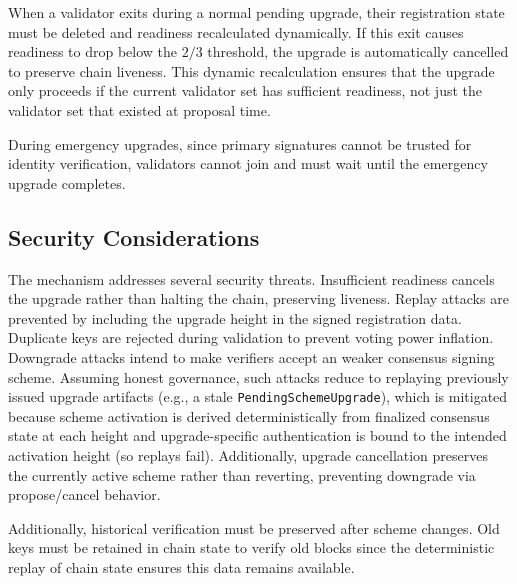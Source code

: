 When a validator exits during a normal pending upgrade, their registration state must be deleted and readiness recalculated dynamically.
If this exit causes readiness to drop below the $2/3$ threshold, the upgrade is automatically cancelled to preserve chain liveness.
This dynamic recalculation ensures that the upgrade only proceeds if the current validator set has sufficient readiness, not just the validator set that existed at proposal time.

During emergency upgrades, since primary signatures cannot be trusted for identity verification, validators cannot join and must wait until the emergency upgrade completes.

\subsection{Security Considerations}\label{subsec:consensus-security}

The mechanism addresses several security threats.
Insufficient readiness cancels the upgrade rather than halting the chain, preserving liveness.
Replay attacks are prevented by including the upgrade height in the signed registration data.
Duplicate keys are rejected during validation to prevent voting power inflation.
Downgrade attacks intend to make verifiers accept an weaker consensus signing scheme.
Assuming honest governance, such attacks reduce to replaying previously issued upgrade artifacts (e.g., a stale \texttt{PendingSchemeUpgrade}), which is mitigated because scheme activation is derived deterministically from finalized consensus state at each height and upgrade-specific authentication is bound to the intended activation height (so replays fail).
Additionally, upgrade cancellation preserves the currently active scheme rather than reverting, preventing downgrade via propose/cancel behavior.

Additionally, historical verification must be preserved after scheme changes.
Old keys must be retained in chain state to verify old blocks since the deterministic replay of chain state ensures this data remains available.
